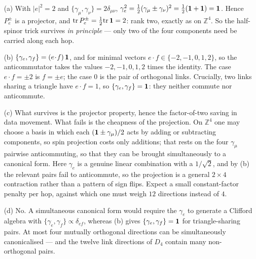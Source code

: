 {(a) With $|e|^2=2$ and $\{\gamma_\mu,\gamma_\nu\}=2\delta_{\mu\nu}$,
$\gamma_e^2=\tfrac12(\gamma_\mu\pm\gamma_\nu)^2
=\tfrac12(\mathbf{1}+\mathbf{1})=\mathbf{1}$. Hence $P_e^\pm$ is a projector,
and $\mathrm{tr}\,P_e^\pm=\tfrac12\mathrm{tr}\,\mathbf{1}=2$: rank two, exactly
as on $\mathbb{Z}^4$. So the half-spinor trick survives \emph{in principle} ---
only two of the four components need be carried along each hop.

(b) $\{\gamma_e,\gamma_f\}=(e\!\cdot\!f)\,\mathbf{1}$, and for minimal vectors
$e\cdot f\in\{-2,-1,0,1,2\}$, so the anticommutator takes the values
$-2,-1,0,1,2$ times the identity. The case $e\cdot f=\pm2$ is $f=\pm e$; the
case $0$ is the pair of orthogonal links. Crucially, two links sharing a
triangle have $e\cdot f=1$, so $\{\gamma_e,\gamma_f\}=\mathbf{1}$: they neither
commute nor anticommute.

(c) What survives is the projector property, hence the factor-of-two saving in
data movement. What fails is the cheapness of the projection. On $\mathbb{Z}^4$
one may choose a basis in which each $(\mathbf{1}\pm\gamma_\mu)/2$ acts by
adding or subtracting components, so spin projection costs only additions; that
rests on the four $\gamma_\mu$ pairwise anticommuting, so that they can be
brought simultaneously to a canonical form. Here $\gamma_e$ is a genuine linear
combination with a $1/\sqrt2$, and by (b) the relevant pairs fail to
anticommute, so the projection is a general $2\times4$ contraction rather than a
pattern of sign flips. Expect a small constant-factor penalty per hop, against
which one must weigh $12$ directions instead of $4$.

(d) No. A simultaneous canonical form would require the $\gamma_e$ to generate a
Clifford algebra with $\{\gamma_e,\gamma_f\}\propto\delta_{ef}$, whereas (b)
gives $\{\gamma_e,\gamma_f\}=\mathbf{1}$ for triangle-sharing pairs. At most
four mutually orthogonal directions can be simultaneously canonicalised --- and
the twelve link directions of $D_4$ contain many non-orthogonal pairs.}

